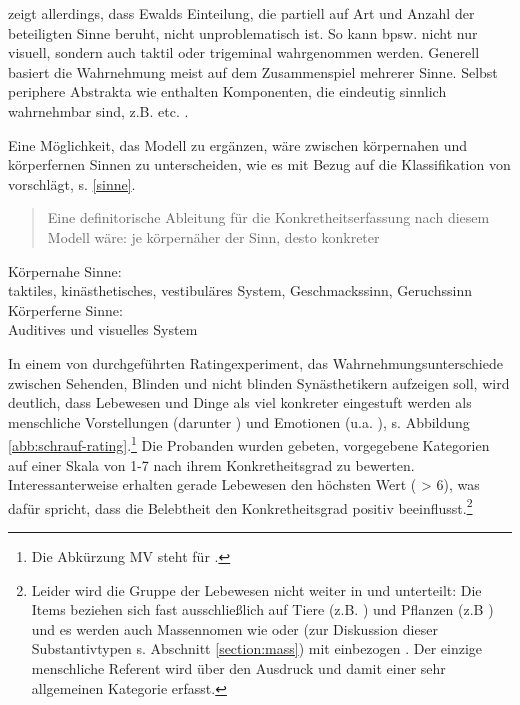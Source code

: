 \textcite{Schrauf2011} zeigt allerdings, dass Ewalds Einteilung, die partiell auf Art und Anzahl der beteiligten Sinne beruht, nicht unproblematisch ist. So kann  bpsw. nicht nur visuell, sondern auch taktil oder trigeminal wahrgenommen werden. Generell basiert die Wahrnehmung meist auf dem Zusammenspiel mehrerer Sinne. Selbst periphere Abstrakta wie  enthalten Komponenten, die eindeutig sinnlich wahrnehmbar sind, z.B.  etc. \parencite[vgl.][41]{Schrauf2011}. 

Eine Möglichkeit, das Modell zu ergänzen, wäre zwischen körpernahen und körperfernen Sinnen zu unterscheiden, wie es \textcite[42]{Schrauf2011} mit Bezug auf die Klassifikation von \textcite{Zimmer2007} vorschlägt, s. \ref{sinne}. \blockcquote[42]{Schrauf2011}{Eine definitorische Ableitung für die Konkretheitserfassung nach diesem Modell wäre: je körpernäher der Sinn, desto konkreter}.   


\begin{exe}
	\ex \label{sinne}
	\begin{xlist}
		\ex \label{nah} Körpernahe Sinne: \\ taktiles, kinästhetisches, vestibuläres System, Geschmackssinn, Geruchssinn
		\ex \label{fern} Körperferne Sinne: \\ Auditives und visuelles System
	\end{xlist}
\end{exe}

In einem von \textcite[163-166]{Schrauf2011} durchgeführten Ratingexperiment, das Wahrnehmungsunterschiede zwischen Sehenden, Blinden und nicht blinden Synästhetikern aufzeigen soll, wird deutlich, dass Lebewesen und Dinge als viel konkreter eingestuft werden als menschliche Vorstellungen (darunter ) und Emotionen (u.a. ), s. Abbildung \ref{abb:schrauf-rating}.\footnote{Die Abkürzung MV steht für .} Die Probanden wurden gebeten, vorgegebene Kategorien auf einer Skala von 1-7 nach ihrem Konkretheitsgrad zu bewerten. Interessanterweise erhalten gerade Lebewesen den höchsten Wert ( > 6), was dafür spricht, dass die Belebtheit den Konkretheitsgrad positiv beeinflusst.\footnote{Leider wird die Gruppe der Lebewesen nicht weiter in  und  unterteilt: Die Items beziehen sich fast ausschließlich auf Tiere (z.B. ) und Pflanzen (z.B ) und es werden auch Massennomen wie  oder  (zur Diskussion dieser Substantivtypen s. Abschnitt \ref{section:mass}) mit einbezogen \parencite[143]{Schrauf2011}. Der einzige menschliche Referent wird über den Ausdruck  und damit einer sehr allgemeinen Kategorie erfasst.}

